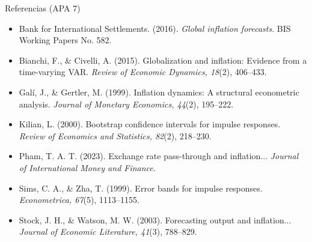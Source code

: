 \documentclass[aspectratio=169,11pt]{beamer}
\begin{document}
\begin{frame}{Referencias (APA 7)}
\small
\begin{itemize}
  \item Bank for International Settlements. (2016). \textit{Global inflation forecasts}. BIS Working Papers No. 582.
  \item Bianchi, F., \& Civelli, A. (2015). Globalization and inflation: Evidence from a time-varying VAR. \textit{Review of Economic Dynamics, 18}(2), 406--433.
  \item Galí, J., \& Gertler, M. (1999). Inflation dynamics: A structural econometric analysis. \textit{Journal of Monetary Economics, 44}(2), 195--222.
  \item Kilian, L. (2000). Bootstrap confidence intervals for impulse responses. \textit{Review of Economics and Statistics, 82}(2), 218--230.
  \item Pham, T. A. T. (2023). Exchange rate pass-through and inflation... \textit{Journal of International Money and Finance}.
  \item Sims, C. A., \& Zha, T. (1999). Error bands for impulse responses. \textit{Econometrica, 67}(5), 1113--1155.
  \item Stock, J. H., \& Watson, M. W. (2003). Forecasting output and inflation... \textit{Journal of Economic Literature, 41}(3), 788--829.
\end{itemize}
\end{frame}
\end{document}
